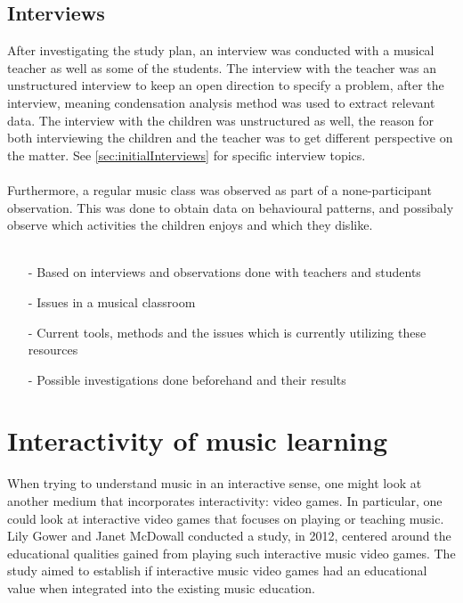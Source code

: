 	\subsection{Interviews}
	After investigating the study plan, an interview was conducted with a musical teacher as well as some of the students. The interview with the teacher was an unstructured interview to keep an open direction to specify a problem, after the interview, meaning condensation analysis method was used to extract relevant data. The interview with the children was unstructured as well, the reason for both interviewing the children and the teacher was to get different perspective on the matter. See \autoref{sec:initialInterviews} for specific interview topics.
	\\\\
	Furthermore, a regular music class was observed as part of a none-participant observation. This was done to obtain data on behavioural patterns, and possibaly observe which activities the children enjoys and which they dislike. 
	\\\\
	\begin{itemize}
	\item[-] Based on interviews and observations done with teachers and students
	\item[-] Issues in a musical classroom
	\item[-] Current tools, methods and the issues which is currently utilizing these resources
	\item[-] Possible investigations done beforehand and their results	
\end{itemize}

\section{Interactivity of music learning}	
When trying to understand music in an interactive sense, one might look at another medium that incorporates interactivity: video games. In particular, one could look at interactive video games that focuses on playing or teaching music. Lily Gower and Janet McDowall conducted a study, in 2012, centered around the educational qualities gained from playing such interactive music video games\cite{interactiveMusicVideoGames}. The study aimed to establish if interactive music video games had an educational value when integrated into the existing music education.\\

